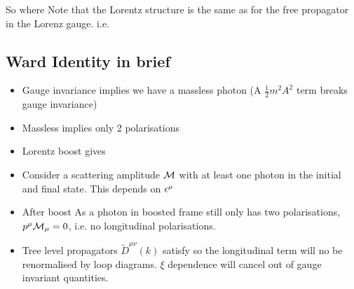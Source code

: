 \documentclass{article}
\begin{document}
So 
where 
Note that the Lorentz structure is the same as for the free propagator in the Lorenz gauge. i.e.

\subsection{Ward Identity in brief}
\begin{itemize}
    \item Gauge invariance implies we have a massless photon (A $\frac{1}{2}m^2 A^2$ term breaks gauge invariance)
    \item Massless implies only 2 polarisations
    \item Lorentz boost gives 
    \item Consider a scattering amplitude $\mathcal{M}$ with at least one photon in the initial and final state. This depends on $\epsilon^\mu$
    \item After boost 
    As a photon in boosted frame still only has two polarisations, $p^\mu \mathcal{M}_\mu = 0$, i.e. no longitudinal polarisations. 
    \item Tree level propagators $\tilde{D}^{\mu\nu}(k)$ satisfy 
    so the longitudinal term will no be renormalised by loop diagrams. $\xi$ dependence will cancel out of gauge invariant quantities. 
\end{itemize}
\end{document}
